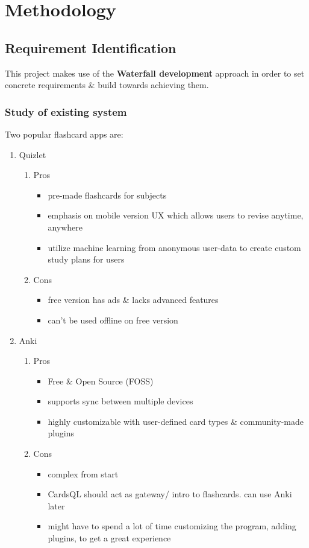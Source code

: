 \documentclass[a4paper]{article}
\begin{document}
\section{Methodology}
\label{sec:orgfa91ac6}
\subsection{Requirement Identification}
\label{sec:org2fca885}
This project makes use of the \textbf{Waterfall development} approach in order to set concrete requirements \& build towards achieving them.
\subsubsection{Study of existing system}
\label{sec:orgeb062fa}
Two popular flashcard apps are:

\begin{enumerate}
\item Quizlet
\label{sec:org37ff442}
\begin{enumerate}
\item Pros
\label{sec:org4353e9f}
\begin{itemize}
\item pre-made flashcards for subjects
\item emphasis on mobile version UX which allows users to revise anytime, anywhere
\item utilize machine learning from anonymous user-data to create custom study plans for users
\end{itemize}
\item Cons
\label{sec:orgdced57a}
\begin{itemize}
\item free version has ads \& lacks advanced features
\item can't be used offline on free version
\end{itemize}
\end{enumerate}

\item Anki
\label{sec:orgb2e91a6}
\begin{enumerate}
\item Pros
\label{sec:org0b78bba}
\begin{itemize}
\item Free \& Open Source (FOSS)
\item supports sync between multiple devices
\item highly customizable with user-defined card types \& community-made plugins
\end{itemize}
\item Cons
\label{sec:org03fa84f}
\begin{itemize}
\item complex from start
\item CardsQL should act as gateway/ intro to flashcards. can use Anki later
\item might have to spend a lot of time customizing the program, adding plugins, to get a great experience
\end{itemize}
\end{enumerate}
\end{enumerate}
\end{document}
